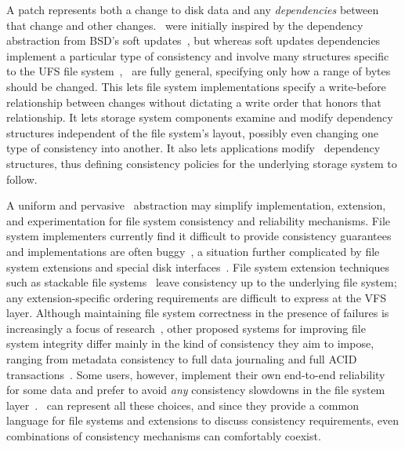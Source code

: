 A patch represents both a change to disk data and any \emph{dependencies}
 between that change and other changes. 
%
\Patches\ were initially inspired by the dependency abstraction from BSD's soft
 updates~\cite{ganger00soft}, but whereas soft updates dependencies
 implement a particular type of consistency
 and involve many structures specific to the UFS file
 system~\cite{mckusick99soft}, \patches\ are fully general,
 specifying only how a range of bytes should be changed.
%
This lets file system implementations specify a
 write-before relationship between changes without dictating
 a write order that honors that relationship.
%
It lets storage system components examine and
 modify dependency structures independent of the file system's layout,
 possibly even changing one type of consistency into another.
%
It also lets applications modify \patch\ dependency structures,
 thus defining consistency policies for the underlying
 storage system to follow.


A uniform and pervasive \patch\ abstraction may simplify
 implementation, extension, and experimentation for
 file system consistency and reliability mechanisms.
%
File system implementers currently find it difficult to provide
 consistency guarantees~\cite{tweedie98journaling,mckusick99soft}
 and implementations are often buggy~\cite{yang04using,yang06explode},
 a situation further complicated by file system extensions and
 special disk interfaces~\cite{soules03metadata,fast04versionfs,quinlan02venti,cornell04wayback,wright03ncryptfs,sivathanu03semantically-smart,sivathanu05database-aware}.
%
File system extension techniques such as stackable file
 systems~\cite{zadok00fist,zadok99extending,heidemann94filesystem,rosenthal90evolving}
 leave consistency up to the underlying file system; any extension-specific
 ordering requirements are difficult to express at the VFS layer.
%
Although maintaining file system
 correctness in the presence of failures is increasingly a focus of
 research~\cite{sivathanuetal05-logic,denehyetal05-journal-guided},
%
other proposed systems for improving file system integrity
 differ mainly in the kind of consistency they aim to impose, ranging from
 metadata consistency to full data journaling and full ACID
 transactions~\cite{gal05transactional,liskov04transactional}.
%
Some users, however, implement their own end-to-end reliability for some data
 and prefer to avoid \emph{any} consistency
 slowdowns in the file system layer~\cite{googleext2}.
%
\Patches\ can represent all these choices, and since they provide a common
 language for file systems and extensions to discuss consistency
 requirements, even combinations of consistency mechanisms can
 comfortably coexist.


